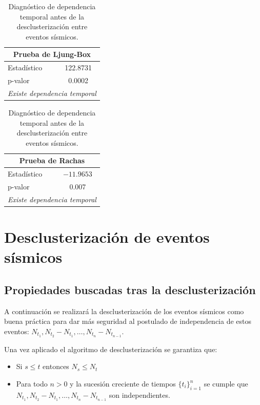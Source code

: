 \begin{table}[H]
    \centering
    \begin{minipage}[t]{0.47\textwidth}
        \centering
        \begin{tabular}{lc}
            \hline
            \multicolumn{2}{c}{\textbf{Prueba de Ljung-Box}} \\
            \hline
            Estadístico & 122.8731  \\
            p-valor     & 0.0002 \\
            \hline
            \multicolumn{2}{c}{\textit{Existe dependencia temporal}} \\
            \hline
        \end{tabular}
    \end{minipage}
    \hfill
    \begin{minipage}[t]{0.47\textwidth}
        \centering
        \begin{tabular}{lc}
            \hline
            \multicolumn{2}{c}{\textbf{Prueba de Rachas}} \\
            \hline
            Estadístico & $-11.9653 $ \\
            p-valor     & 0.007 \\
            \hline
            \multicolumn{2}{c}{\textit{Existe dependencia temporal}} \\
            \hline
        \end{tabular}
    \end{minipage}
    
    \caption{Diagnóstico de dependencia temporal antes de la desclusterización entre eventos sísmicos.}
    \label{tab:pruebas-temporales}
\end{table}

\section{Desclusterización de eventos sísmicos}

\subsection{Propiedades buscadas tras la desclusterización}
A continuación se realizará la desclusterización de los eventos sísmicos como buena práctica para dar más seguridad al postulado de independencia de estos eventos: $N_{t_1}, N_{t_2} - N_{t_1}, \dots, N_{t_n} - N_{t_{n-1}}$.

Una vez aplicado el algoritmo de desclusterización se garantiza que:
\begin{itemize}
    \item Si $s\leq t$ entonces $N_s \leq N_t$
    \item Para todo $n>0$ y la sucesión creciente de tiempos $\{t_i\}_{i=1}^n$ se cumple que $N_{t_1}, N_{t_2}-N_{t_1}, \dots, N_{t_n}-N_{t_{n-1}}$ son independientes.
\end{itemize}

